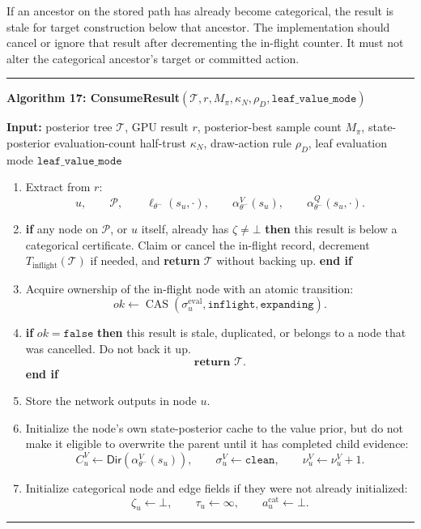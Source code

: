 \documentclass[11pt]{article}
\newcommand{\Tree}{\mathcal{T}}
\newcommand{\Path}{\mathcal{P}}
\newcommand{\CAS}{\operatorname{CAS}}
\newcommand{\DirObj}{\mathsf{Dir}}
\newenvironment{algorithmblock}[1]
{
  \par\medskip
  \noindent\hrule\par\smallskip
  \noindent\textbf{#1}
  \par\smallskip
}
{
  \par\smallskip\noindent\hrule\par\medskip
}
\newcommand{\Input}{\textbf{Input: }}
\newcommand{\Return}{\textbf{return }}
\newcommand{\If}{\textbf{if }}
\newcommand{\Then}{\textbf{ then }}
\newcommand{\EndIf}{\textbf{end if}}
\begin{document}
If an ancestor on the stored path has already become categorical, the result is
stale for target construction below that ancestor. The implementation should
cancel or ignore that result after decrementing the in-flight counter. It must
not alter the categorical ancestor's target or committed action.

\begin{algorithmblock}{Algorithm 17: ConsumeResult\((\Tree,r,M_\pi,\kappa_N,\rho_D,\texttt{leaf\_value\_mode})\)}

\Input posterior tree \(\Tree\), GPU result \(r\), posterior-best sample count \(M_\pi\), state-posterior evaluation-count half-trust \(\kappa_N\), draw-action rule \(\rho_D\), leaf evaluation mode \(\texttt{leaf\_value\_mode}\)

\begin{enumerate}[leftmargin=2em]
  \item Extract from \(r\):
  \[
  u,
  \qquad
  \Path,
  \qquad
  \ell_{\theta^-}(s_u,\cdot),
  \qquad
  \alpha_{\theta^-}^V(s_u),
  \qquad
  \alpha_{\theta^-}^Q(s_u,\cdot).
  \]

  \item \If any node on \(\Path\), or \(u\) itself, already has
  \(\zeta\ne\bot\) \Then this result is below a categorical certificate. Claim
  or cancel the in-flight record, decrement \(T_{\mathrm{inflight}}(\Tree)\) if
  needed, and \Return \(\Tree\) without backing up. \EndIf

  \item Acquire ownership of the in-flight node with an atomic transition:
  \[
  ok\gets
  \CAS
  \left(
  \sigma^{\mathrm{eval}}_u,
  \texttt{inflight},
  \texttt{expanding}
  \right).
  \]

  \item \If \(ok=\texttt{false}\) \Then
  this result is stale, duplicated, or belongs to a node that was cancelled. Do
  not back it up.
  \[
  \Return \Tree.
  \]
  \EndIf

  \item Store the network outputs in node \(u\).

  \item Initialize the node's own state-posterior cache to the value prior, but
  do not make it eligible to overwrite the parent until it has completed child
  evidence:
  \[
  C^V_u\gets\DirObj(\alpha_{\theta^-}^V(s_u)),
  \qquad
  \sigma^V_u\gets\texttt{clean},
  \qquad
  \nu^V_u\gets\nu^V_u+1.
  \]

  \item Initialize categorical node and edge fields if they were not already
  initialized:
  \[
  \zeta_u\gets\bot,
  \qquad
  \tau_u\gets\infty,
  \qquad
  a_u^{\mathrm{cat}}\gets\bot.
  \]


\end{enumerate}
\end{algorithmblock}
\end{document}
